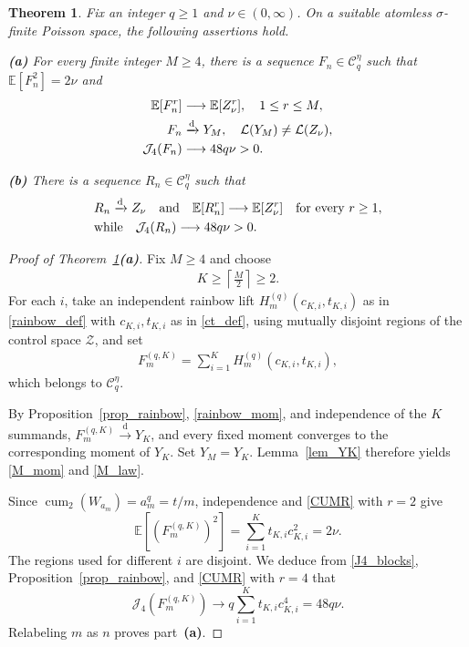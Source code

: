 \documentclass[letterpaper,11pt,reqno]{amsart}
\numberwithin{equation}{section}
\theoremstyle{plain}
\newtheorem{theorem}{Theorem}[section]
\theoremstyle{definition}
\theoremstyle{remark}
\newcommand{\E}{\mathbb{E}}
\newcommand{\cC}{\mathcal{C}}
\newcommand{\cL}{\mathcal{L}}
\newcommand{\cZ}{\mathcal{Z}}
\DeclareMathOperator{\cum}{cum}
\newcommand{\noi}{\noindent}
\newcommand{\Jfour}{\mathcal J_4}
\newcommand{\s}{\sigma}
\newcommand{\AND}{\quad{\rm and}\quad}
\begin{document}
\begin{theorem}
\label{thm44}
Fix an integer $q\geq1$ and $\nu\in(0,\infty)$.  On a suitable
atomless $\s$-finite Poisson space, the following assertions hold.


{\rm\bf (a)} For every finite integer $M\geq4$, there is a sequence
$F_n\in\cC_q^\eta$ such that $\E[F_n^2]=2\nu$ and
\noi
\begin{align}
 \E[F_n^r]
 &\longrightarrow\E[Z_\nu^r],
 \quad 1\leq r\leq M,
 \label{M_mom}\\
 F_n&\xrightarrow{\mathrm d}Y_M,
 \quad
 \cL(Y_M)\neq\cL(Z_\nu),
 \label{M_law}\\
 \Jfour(F_n)&\longrightarrow48q\nu > 0.
 \notag
\end{align}

{\rm\bf (b)} There is a sequence
$R_n\in\cC_q^\eta$ such that
\noi
\begin{align}
& R_n\xrightarrow{\mathrm d}Z_\nu
 \AND
 \E[R_n^r]\longrightarrow\E[Z_\nu^r]
 \quad\text{for every }r\geq1,
 \notag\\
&\text{while}\quad\Jfour(R_n)\longrightarrow48q\nu>0.
 \label{all_J4}
\end{align}


\end{theorem}


\begin{proof}[Proof of Theorem~\ref{thm44}\rm\textbf{(a)}]
Fix $M\geq4$ and choose
\noi
\begin{align*}
 K\geq\left\lceil\frac M2\right\rceil \geq 2.
\end{align*}
For each $i$, take an independent rainbow lift
$H_m^{(q)}(c_{K,i},t_{K,i})$ as in \eqref{rainbow_def}
with $c_{K,i},t_{K,i}$ as in \eqref{ct_def},
using mutually disjoint regions of the
control space $\cZ$, and set
\noi
\begin{align}
 F_m^{(q,K)}
 =\sum_{i=1}^K
 H_m^{(q)}(c_{K,i},t_{K,i}),
 \label{Fm_qK}
\end{align}
which belongs to $\cC_q^\eta$.

By Proposition~\ref{prop_rainbow}, \eqref{rainbow_mom}, and
independence of the $K$ summands,
$F_m^{(q,K)}\xrightarrow{\mathrm d}Y_K$, and every fixed moment
converges to the corresponding moment of $Y_K$.  Set $Y_M=Y_K$.
Lemma~\ref{lem_YK} therefore yields
\eqref{M_mom} and \eqref{M_law}.


Since $\cum_2(W_{a_m})=a_m^q=t/m$, independence and
\eqref{CUMR} with $r=2$ give
\[
 \E[(F_m^{(q,K)})^2]
 =\sum_{i=1}^Kt_{K,i}c_{K,i}^2
 =2\nu.
\]
The regions used for different $i$ are disjoint.  We deduce from
\eqref{J4_blocks}, Proposition~\ref{prop_rainbow}, and
\eqref{CUMR} with $r=4$ that
\[
 \Jfour(F_m^{(q,K)})
 \longrightarrow q\sum_{i=1}^Kt_{K,i}c_{K,i}^4
 =48q\nu.
\]
Relabeling $m$ as $n$ proves part~{\bf(a)}.
\qedhere

\end{proof}
\end{document}
